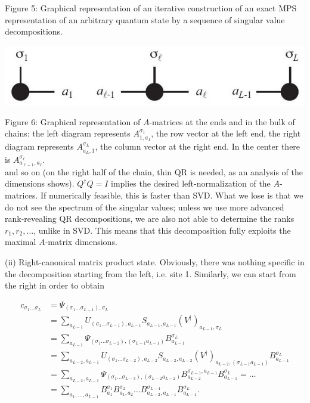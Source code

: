 \documentclass[12pt]{article}
\begin{document}
Figure 5: Graphical representation of an iterative construction of an exact MPS representation of an arbitrary quantum state by a sequence of singular value decompositions.

\begin{center}
\includegraphics[max width=\textwidth]{2024_05_04_afc4ad226da9ccfe0ac8g-021(1)}
\end{center}

Figure 6: Graphical representation of $A$-matrices at the ends and in the bulk of chains: the left diagram represents $A_{1, a_{1}}^{\sigma_{1}}$, the row vector at the left end, the right diagram represents $A_{a_{L}, 1}^{\sigma_{L}}$, the column vector at the right end. In the center there is $A_{a_{\ell-1}, a_{\ell}}^{\sigma_{\ell}}$.\\
and so on (on the right half of the chain, thin $\mathrm{QR}$ is needed, as an analysis of the dimensions shows). $Q^{\dagger} Q=I$ implies the desired left-normalization of the $A$-matrices. If numerically feasible, this is faster than SVD. What we lose is that we do not see the spectrum of the singular values; unless we use more advanced rank-revealing $\mathrm{QR}$ decompositions, we are also not able to determine the ranks $r_{1}, r_{2}, \ldots$, unlike in SVD. This means that this decomposition fully exploits the maximal $A$-matrix dimensions.

(ii) Right-canonical matrix product state. Obviously, there was nothing specific in the decomposition starting from the left, i.e. site 1. Similarly, we can start from the right in order to obtain

$$
\begin{aligned}
c_{\sigma_{1} \ldots \sigma_{L}} & =\Psi_{\left(\sigma_{1} \ldots \sigma_{L-1}\right), \sigma_{L}} \\
& =\sum_{a_{L-1}} U_{\left(\sigma_{1} \ldots \sigma_{L-1}\right), a_{L-1}} S_{a_{L-1}, a_{L-1}}\left(V^{\dagger}\right)_{a_{L-1}, \sigma_{L}} \\
& =\sum_{a_{L-1}} \Psi_{\left(\sigma_{1} \ldots \sigma_{L-2}\right),\left(\sigma_{L-1} a_{L-1}\right)} B_{a_{L-1}}^{\sigma_{L}} \\
& =\sum_{a_{L-2}, a_{L-1}} U_{\left(\sigma_{1} \ldots \sigma_{L-2}\right), a_{L-2}} S_{a_{L-2}, a_{L-2}}\left(V^{\dagger}\right)_{a_{L-2},\left(\sigma_{L-1} a_{L-1}\right)} B_{a_{L-1}}^{\sigma_{L}} \\
& =\sum_{a_{L-2}, a_{L-1}} \Psi_{\left(\sigma_{1} \ldots \sigma_{L-3}\right),\left(\sigma_{L-2} a_{L-2}\right)} B_{a_{L-2}}^{\sigma_{L-1}, a_{L-1}} B_{a_{L-1}}^{\sigma_{L}}=\ldots \\
& =\sum_{a_{1}, \ldots, a_{L-1}} B_{a_{1}}^{\sigma_{1}} B_{a_{1}, a_{2}}^{\sigma_{2}} \ldots B_{a_{L-2}, a_{L-1}}^{\sigma_{L-1}} B_{a_{L-1}}^{\sigma_{L}} .
\end{aligned}
$$
\end{document}

